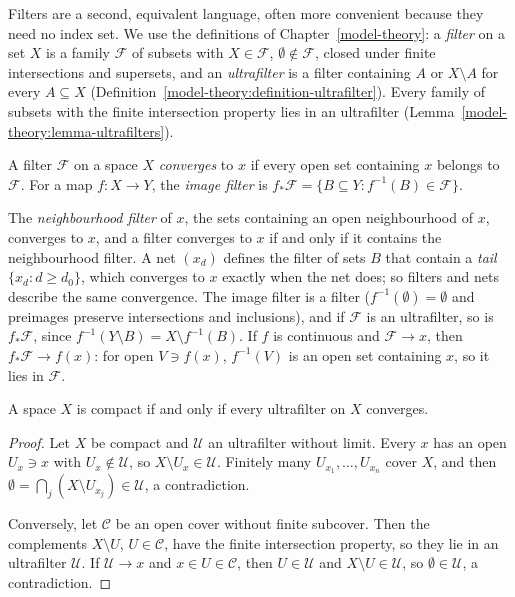 Filters are a second, equivalent language, often more convenient because they need no index set. We use the definitions of Chapter~\ref{model-theory}: a \emph{filter} on a set $X$ is a family $\mathcal{F}$ of
subsets with $X \in \mathcal{F}$, $\emptyset \notin \mathcal{F}$, closed under finite intersections and supersets, and an \emph{ultrafilter} is a filter containing $A$ or $X \setminus A$ for every
$A \subseteq X$ (Definition~\ref{model-theory:definition-ultrafilter}). Every family of subsets with the finite intersection property lies in an ultrafilter
(Lemma~\ref{model-theory:lemma-ultrafilters}).

\begin{definition}\label{general-topology:definition-filter-convergence}
A filter $\mathcal{F}$ on a space $X$ \emph{converges} to $x$ if every open set containing $x$ belongs to $\mathcal{F}$. For a map $f \colon X \to Y$, the \emph{image filter} is
$f_*\mathcal{F} = \{B \subseteq Y : f^{-1}(B) \in \mathcal{F}\}$.
\end{definition}

The \emph{neighbourhood filter} of $x$, the sets containing an open neighbourhood of $x$, converges to $x$, and a filter converges to $x$ if and only if it contains the neighbourhood filter. A net $(x_d)$
defines the filter of sets $B$ that contain a \emph{tail} $\{x_d : d \geq d_0\}$, which converges to $x$ exactly when the net does; so filters and nets describe the same convergence. The image filter is a
filter ($f^{-1}(\emptyset) = \emptyset$ and preimages preserve intersections and inclusions), and if $\mathcal{F}$ is an ultrafilter, so is $f_*\mathcal{F}$, since $f^{-1}(Y \setminus B) = X \setminus f^{-1}(B)$.
If $f$ is continuous and $\mathcal{F} \to x$, then $f_*\mathcal{F} \to f(x)$: for open $V \ni f(x)$, $f^{-1}(V)$ is an open set containing $x$, so it lies in $\mathcal{F}$.

\begin{theorem}\label{general-topology:theorem-compact-ultrafilters}
A space $X$ is compact if and only if every ultrafilter on $X$ converges.
\end{theorem}

\begin{proof}
Let $X$ be compact and $\mathcal{U}$ an ultrafilter without limit. Every $x$ has an open $U_x \ni x$ with $U_x \notin \mathcal{U}$, so $X \setminus U_x \in \mathcal{U}$. Finitely many $U_{x_1}, \ldots, U_{x_n}$
cover $X$, and then $\emptyset = \bigcap_j(X \setminus U_{x_j}) \in \mathcal{U}$, a contradiction.

Conversely, let $\mathcal{C}$ be an open cover without finite subcover. Then the complements $X \setminus U$, $U \in \mathcal{C}$, have the finite intersection property, so they lie in an ultrafilter
$\mathcal{U}$. If $\mathcal{U} \to x$ and $x \in U \in \mathcal{C}$, then $U \in \mathcal{U}$ and $X \setminus U \in \mathcal{U}$, so $\emptyset \in \mathcal{U}$, a contradiction.
\end{proof}

